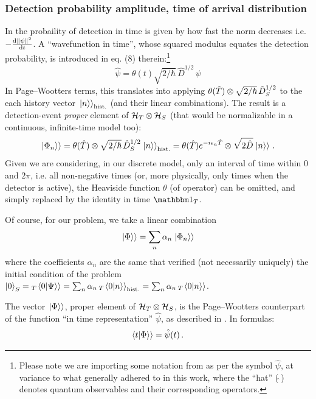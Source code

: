 \subsubsection{Detection probability amplitude, time of arrival distribution}

In \cite{RuschhauptAbsorption} the probaility of detection in time is given
by how fast the norm decreases i.e. $-\dv{\norm{\psi}^2}{t}$.
A ``wavefunction in time'', whose squared modulus equates the detection probability,
is introduced in eq. (8) therein:\footnote{
  Please note we are importing some notation from \cite{RuschhauptAbsorption} as per the symbol $\hat{\psi}$,
  at variance to what generally adhered to in this work,
  where the ``hat'' ($\hat{\;}$) denotes quantum observables and their corresponding operators.
}
\begin{equation}
  \hat{\psi} = \theta(t) \sqrt{2/\hbar}\,\hat{D}^{1/2}\,\psi
\end{equation}
In Page--Wootters terms, this translates into applying
$\theta(\hat{T}) \otimes \sqrt{2/\hbar}\,\hat{D}^{1/2}_S$
to the each history vector $\left.\left| n \right\rangle\right\rangle_{\text{hist.}}$
(and their linear combinations).
The result is a detection-event \emph{proper} element of ${\mathcal{H}_T \otimes \mathcal{H}_S}$
(that would be normalizable in a continuous, infinite-time model too):
\begin{equation}\label{eq:qubit_detection_wavefunction}
  \left.\left| \Phi_n \right\rangle\right\rangle =
    \theta(\hat{T}) \otimes \sqrt{2/\hbar}\,\hat{D}^{1/2}_S \left.\left| n \right\rangle\right\rangle_{\text{hist.}} =
    \theta(\hat{T}) e^{-i\epsilon_{n}\hat{T}} \otimes \sqrt{2\hat{D}} \left.\left| n \right\rangle\right\rangle \, \text{.}
\end{equation}
Given we are considering, in our discrete model, only an interval of time within $0$ and $2\pi$,
i.e. all non-negative times (or, more physically, only times when the detector is active),
the Heaviside function $\theta$ (of operator) can be omitted, and simply replaced
by the identity in time $\idop_T$.

Of course, for our problem, we take a linear combination
\begin{equation}
  \left.\left| \Phi \right\rangle\right\rangle = \sum_n \alpha_n \left.\left| \Phi_n \right\rangle\right\rangle
\end{equation}
where the coefficients $\alpha_n$ are the same that verified
(not necessarily uniquely)
the initial condition of the problem
$\ket{0}_S = {}_T\!\left.\left\langle 0 \middle| \Psi \right\rangle\right\rangle = \sum_n \alpha_n \, {}_T\!\left.\left\langle 0 \middle| n \right\rangle\right\rangle_{\text{hist.}} = \sum_n \alpha_n \, {}_T\!\left.\left\langle 0 \middle| n \right\rangle\right\rangle$.

\citereset
The vector $\left.\left| \Phi \right\rangle\right\rangle$, proper element of $\mathcal{H}_T \otimes \mathcal{H}_S$,
is the Page--Wootters counterpart of the function
``in time representation'' $\hat{\psi}$,
as
described in \cite{RuschhauptAbsorption}. In formulas:
\begin{equation}
  \!\left.\left\langle t \middle| \Phi \right\rangle\right\rangle = \hat{\psi}(t) \, \text{.}
\end{equation}


